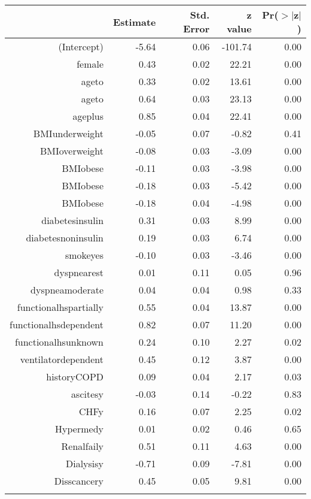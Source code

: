 \bigskip\bigskip
\centering
\begin{tabular}{rrrrr}
  \hline
 & Estimate & Std. Error & z value & Pr($>$$|$z$|$) \\ 
  \hline
(Intercept) & -5.64 & 0.06 & -101.74 & 0.00 \\ 
  female & 0.43 & 0.02 & 22.21 & 0.00 \\ 
  age\-65\-to\-74 & 0.33 & 0.02 & 13.61 & 0.00 \\ 
  age\-75\-to\-84 & 0.64 & 0.03 & 23.13 & 0.00 \\ 
  age\-85\-plus & 0.85 & 0.04 & 22.41 & 0.00 \\ 
  BMI\-underweight & -0.05 & 0.07 & -0.82 & 0.41 \\ 
  BMI\-overweight & -0.08 & 0.03 & -3.09 & 0.00 \\ 
  BMI\-obese\-1 & -0.11 & 0.03 & -3.98 & 0.00 \\ 
  BMI\-obese\-2 & -0.18 & 0.03 & -5.42 & 0.00 \\ 
  BMI\-obese\-3 & -0.18 & 0.04 & -4.98 & 0.00 \\ 
  diabetes\-insulin & 0.31 & 0.03 & 8.99 & 0.00 \\ 
  diabetes\-noninsulin & 0.19 & 0.03 & 6.74 & 0.00 \\ 
  smoke\-yes & -0.10 & 0.03 & -3.46 & 0.00 \\ 
  dyspnea\-rest & 0.01 & 0.11 & 0.05 & 0.96 \\ 
  dyspnea\-moderate & 0.04 & 0.04 & 0.98 & 0.33 \\ 
  functional\-hs\-partially & 0.55 & 0.04 & 13.87 & 0.00 \\ 
  functional\-hs\-dependent & 0.82 & 0.07 & 11.20 & 0.00 \\ 
  functional\-hs\-unknown & 0.24 & 0.10 & 2.27 & 0.02 \\ 
  ventilator\-dependent & 0.45 & 0.12 & 3.87 & 0.00 \\ 
  history\-COPD & 0.09 & 0.04 & 2.17 & 0.03 \\ 
  ascites\-y & -0.03 & 0.14 & -0.22 & 0.83 \\ 
  CHF\-y & 0.16 & 0.07 & 2.25 & 0.02 \\ 
  Hyper\-med\-y & 0.01 & 0.02 & 0.46 & 0.65 \\ 
  Renal\-fail\-y & 0.51 & 0.11 & 4.63 & 0.00 \\ 
  Dialysis\-y & -0.71 & 0.09 & -7.81 & 0.00 \\ 
  Diss\-cancer\-y & 0.45 & 0.05 & 9.81 & 0.00 \\ 
$$
\end{tabular}
